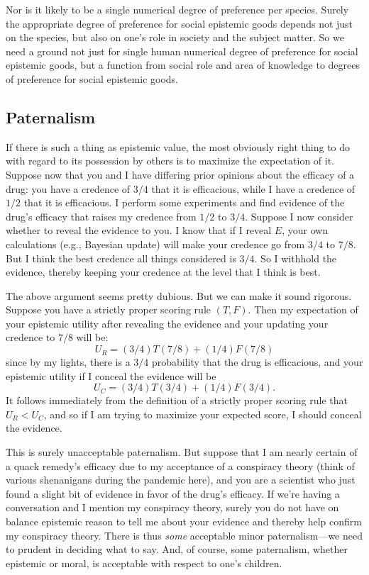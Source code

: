 Nor is it likely to be a single numerical degree of preference per species. Surely the appropriate degree of preference for social epistemic 
goods depends not just on the species, but also on one's role in society and the subject matter. So we need a ground not just for single human numerical degree of
preference for social epistemic goods, but a function from social role and area of knowledge to degrees of preference for
social epistemic goods.

\subsection{Paternalism}
If there is such a thing as epistemic value, the most obviously right thing to do with regard to its possession
by others is to maximize the expectation of it. Suppose now that you and I have differing prior opinions about the efficacy
of a drug: you have a credence of $3/4$ that it is efficacious, while I have a credence of $1/2$ that it is efficacious.
I perform some experiments and find evidence of the drug's efficacy that raises my credence from $1/2$ to $3/4$.
Suppose I now consider whether to reveal the evidence to you. I know that if I reveal $E$, your own calculations
(e.g., Bayesian update) will make your credence go from $3/4$ to $7/8$. But I think the best credence all things considered is $3/4$.
So I withhold the evidence, thereby keeping your credence at the level that I think is best. 

The above argument seems pretty dubious. But we can make it sound rigorous. Suppose you have a strictly proper 
scoring rule $(T,F)$. Then
my expectation of your epistemic utility after revealing the evidence and your updating your credence to $7/8$ will be:
$$
	U_R = (3/4)T(7/8)+(1/4)F(7/8)
$$
since by my lights, there is a $3/4$ probability that the drug is efficacious, and your epistemic utility if I
conceal the evidence will be
$$
	U_C = (3/4)T(3/4)+(1/4)F(3/4).
$$
It follows immediately from the definition of a strictly proper scoring rule that $U_R < U_C$, and so if I am trying
to maximize your expected score, I should conceal the evidence.

This is surely unacceptable paternalism. But suppose that I am nearly certain of a quack remedy's
efficacy due to my acceptance of a conspiracy theory (think of various
shenanigans during the pandemic here), and you are a scientist who just found a slight bit of evidence 
in favor of the drug's efficacy. If we're having a conversation and I mention my conspiracy theory, surely
you do not have on balance epistemic reason to tell me about your evidence and thereby help confirm my conspiracy
theory. There is thus \textit{some} acceptable minor paternalism---we need to prudent in deciding what to say. And, of course, some paternalism, whether epistemic or moral, is acceptable with respect to one's children.

